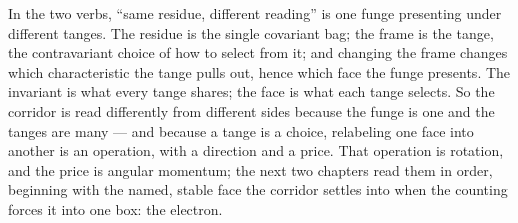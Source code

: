 In the two verbs, ``same residue, different reading'' is one funge presenting under different tanges. The residue is the
single covariant bag; the frame is the tange, the contravariant choice of how to select from it; and changing the frame
changes which characteristic the tange pulls out, hence which face the funge presents. The invariant is what every tange
shares; the face is what each tange selects. So the corridor is read differently from different sides because the funge is
one and the tanges are many --- and because a tange is a choice, relabeling one face into another is an operation, with a
direction and a price. That operation is rotation, and the price is angular momentum; the next two chapters read them in
order, beginning with the named, stable face the corridor settles into when the counting forces it into one box: the
electron.
